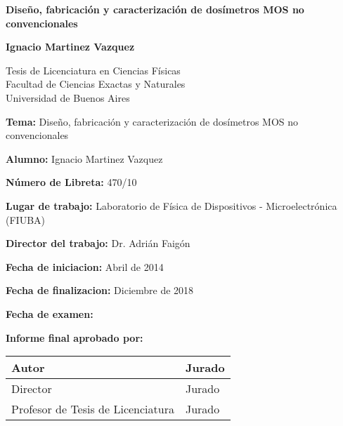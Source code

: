 \begin{titlepage}
   \begin{center}
\vspace*{1cm}

\Huge
\textbf{Diseño, fabricación y caracterización de dosímetros MOS no convencionales}

\vspace{0.5cm}
 
\vspace{1.5cm}
 
\Large
\textbf{Ignacio Martinez Vazquez}

\vfill

Tesis de Licenciatura en Ciencias Físicas\\
Facultad de Ciencias Exactas y Naturales\\
Universidad de Buenos Aires\\
 
       \vspace{0.8cm}
 
   \end{center}
\end{titlepage}
%
\textbf{Tema:} Diseño, fabricación y caracterización de dosímetros MOS no convencionales

\textbf{Alumno:} Ignacio Martinez Vazquez 

\textbf{Número de Libreta:} 470/10

\textbf{Lugar de trabajo:} Laboratorio de Física de Dispositivos - Microelectrónica (FIUBA)

\textbf{Director del trabajo:} Dr. Adrián Faigón

\textbf{Fecha de iniciacion:} Abril de 2014

\textbf{Fecha de finalizacion:} Diciembre de 2018

\textbf{Fecha de examen:}

\textbf{Informe final aprobado por:}

\vfill
\centering
\begin{tabular}{| >{\centering\arraybackslash}p{6cm} | >{\centering\arraybackslash}p{6cm} |}
    \hline
    Autor&  Jurado\\[70pt]
\hline
Director&  Jurado\\[70pt]
\hline
Profesor de Tesis de Licenciatura&  Jurado\\[70pt]
\hline
\end{tabular}
\newpage

